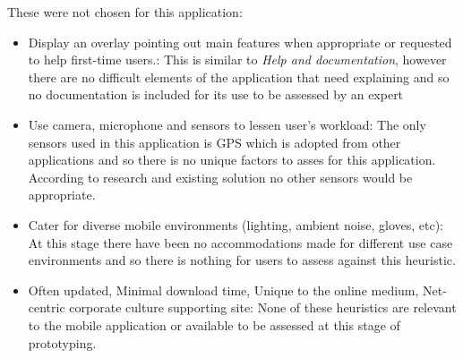 \documentclass[a4 paper, 12pt]{article}
\begin{document}
    These were not chosen for this application:
        \begin{itemize}
            \item \textcolor{mygreen}{Display an overlay pointing out main features when appropriate or requested to help first-time users.:} This is similar to \textit{\textcolor{myblue}{Help and documentation}}, however there are no difficult elements of the application that need explaining and so no documentation is included for its use to be assessed by an expert
            \item \textcolor{mygreen}{Use camera, microphone and sensors to lessen user’s  workload:} The only sensors used in this application is GPS which is adopted from other applications and so there is no unique factors to asses for this application. According to research and existing solution no other sensors would be appropriate. 
            \item \textcolor{mygreen}{Cater for diverse mobile environments (lighting, ambient noise, gloves, etc):} At this stage there have been no accommodations made for different use case environments and so there is nothing for users to assess against this heuristic. 
            \item \textcolor{myorange}{Often updated, Minimal download time, Unique to the online medium, Net-centric corporate culture supporting site:} None of these heuristics are relevant to the mobile application or available to be assessed at this stage of prototyping.            
        \end{itemize}
\end{document}
